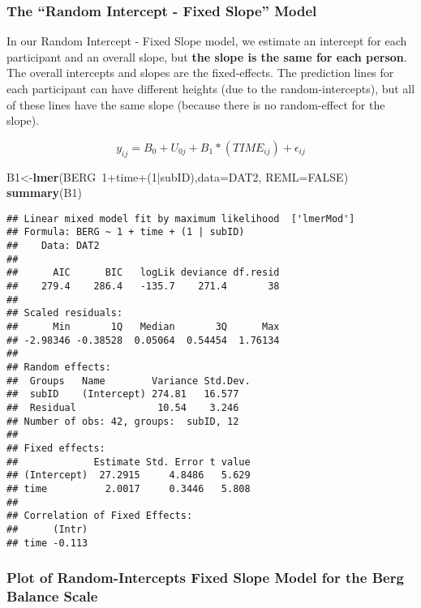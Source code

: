 \documentclass[]{article}
\newenvironment{Shaded}{\begin{snugshade}}{\end{snugshade}}
\newcommand{\KeywordTok}[1]{\textcolor[rgb]{0.13,0.29,0.53}{\textbf{{#1}}}}
\newcommand{\DataTypeTok}[1]{\textcolor[rgb]{0.13,0.29,0.53}{{#1}}}
\newcommand{\DecValTok}[1]{\textcolor[rgb]{0.00,0.00,0.81}{{#1}}}
\newcommand{\OtherTok}[1]{\textcolor[rgb]{0.56,0.35,0.01}{{#1}}}
\newcommand{\NormalTok}[1]{{#1}}
\begin{document}
\newpage

\subsubsection{\texorpdfstring{The ``Random Intercept - Fixed Slope''
Model}{The Random Intercept - Fixed Slope Model}}\label{the-random-intercept---fixed-slope-model}

In our Random Intercept - Fixed Slope model, we estimate an intercept
for each participant and an overall slope, but \textbf{the slope is the
same for each person}. The overall intercepts and slopes are the
fixed-effects. The prediction lines for each participant can have
different heights (due to the random-intercepts), but all of these lines
have the same slope (because there is no random-effect for the slope).

\[y_{ij} = B_0 + U_{0j} + B_1*(TIME_{ij}) + \epsilon_{ij}\]

\begin{Shaded}
\begin{Highlighting}[]
\NormalTok{B1<-}\KeywordTok{lmer}\NormalTok{(BERG~}\DecValTok{1}\NormalTok{+time+(}\DecValTok{1}\NormalTok{|subID),}\DataTypeTok{data=}\NormalTok{DAT2, }\DataTypeTok{REML=}\OtherTok{FALSE}\NormalTok{)}
\KeywordTok{summary}\NormalTok{(B1)}
\end{Highlighting}
\end{Shaded}

\begin{verbatim}
## Linear mixed model fit by maximum likelihood  ['lmerMod']
## Formula: BERG ~ 1 + time + (1 | subID)
##    Data: DAT2
## 
##      AIC      BIC   logLik deviance df.resid 
##    279.4    286.4   -135.7    271.4       38 
## 
## Scaled residuals: 
##      Min       1Q   Median       3Q      Max 
## -2.98346 -0.38528  0.05064  0.54454  1.76134 
## 
## Random effects:
##  Groups   Name        Variance Std.Dev.
##  subID    (Intercept) 274.81   16.577  
##  Residual              10.54    3.246  
## Number of obs: 42, groups:  subID, 12
## 
## Fixed effects:
##             Estimate Std. Error t value
## (Intercept)  27.2915     4.8486   5.629
## time          2.0017     0.3446   5.808
## 
## Correlation of Fixed Effects:
##      (Intr)
## time -0.113
\end{verbatim}

\newpage

\subsubsection{Plot of Random-Intercepts Fixed Slope Model for the Berg
Balance
Scale}\label{plot-of-random-intercepts-fixed-slope-model-for-the-berg-balance-scale}
\end{document}
